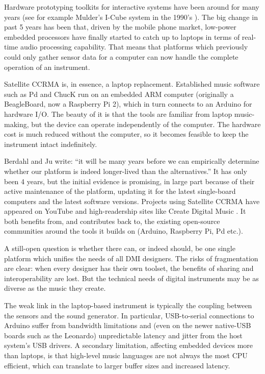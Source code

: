 Hardware prototyping toolkits for interactive systems have been around for many years (see for example Mulder's I-Cube system in the 1990's \cite{Mulder:1995}). The big change in past 5 years has been that, driven by the mobile phone market, low-power embedded processors have finally started to catch up to laptops in terms of real-time audio processing capability. That means that platforms which previously could only gather sensor data for a computer can now handle the complete operation of an instrument.

Satellite CCRMA is, in essence, a laptop replacement. Established music software such as Pd and ChucK run on an embedded ARM computer (originally a BeagleBoard, now a Raspberry Pi 2), which in turn connects to an Arduino for hardware I/O. The beauty of it is that the tools are familiar from laptop music-making, but the device can operate independently of the computer. The hardware cost is much reduced without the computer, so it becomes feasible to keep the instrument intact indefinitely.

Berdahl and Ju write: ``it will be many years before we can empirically determine whether our platform is indeed longer-lived than the alternatives.'' It has only been 4 years, but the initial evidence is promising, in large part because of their active maintenance of the platform, updating it for the latest single-board computers and the latest software versions. Projects using Satellite CCRMA have appeared on YouTube and high-readership sites like Create Digital Music \cite{Barreiro:2013}. It both benefits from, and contributes back to, the existing open-source communities around the tools it builds on (Arduino, Raspberry Pi, Pd etc.).

A still-open question is whether there can, or indeed should, be one single platform which unifies the needs of all DMI designers. The risks of fragmentation are clear: when every designer has their own toolset, the benefits of sharing and interoperability are lost. But the technical needs of digital instruments may be as diverse as the music they create.

The weak link in the laptop-based instrument is typically the coupling between the sensors and the sound generator. In particular, USB-to-serial connections to Arduino suffer from bandwidth limitations and (even on the newer native-USB boards such as the Leonardo) unpredictable latency and jitter from the host system's USB drivers. A secondary limitation, affecting embedded devices more than laptops, is that high-level music languages are not always the most CPU efficient, which can translate to larger buffer sizes and increased latency.

